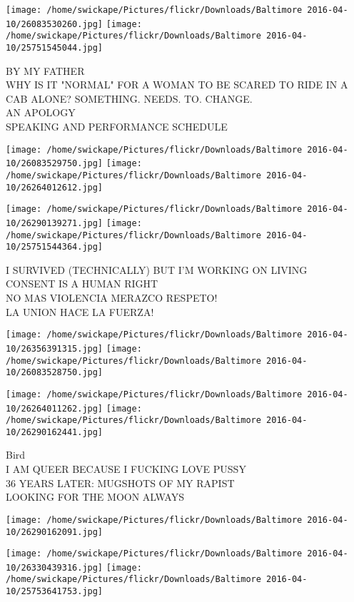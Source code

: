 \documentclass[10pt,letterpaper]{article}
\begin{document}
\texttt{[image: /home/swickape/Pictures/flickr/Downloads/Baltimore 2016-04-10/26083530260.jpg]}
\texttt{[image: /home/swickape/Pictures/flickr/Downloads/Baltimore 2016-04-10/25751545044.jpg]}

BY MY FATHER\\
WHY IS IT "NORMAL" FOR A WOMAN TO BE SCARED TO RIDE IN A CAB ALONE?  SOMETHING.  NEEDS.  TO.  CHANGE.\\
AN APOLOGY\\
SPEAKING AND PERFORMANCE SCHEDULE\\
\pagebreak

\texttt{[image: /home/swickape/Pictures/flickr/Downloads/Baltimore 2016-04-10/26083529750.jpg]}
\texttt{[image: /home/swickape/Pictures/flickr/Downloads/Baltimore 2016-04-10/26264012612.jpg]}

\texttt{[image: /home/swickape/Pictures/flickr/Downloads/Baltimore 2016-04-10/26290139271.jpg]}
\texttt{[image: /home/swickape/Pictures/flickr/Downloads/Baltimore 2016-04-10/25751544364.jpg]}

I SURVIVED (TECHNICALLY) BUT I'M WORKING ON LIVING\\
CONSENT IS A HUMAN RIGHT\\
NO MAS VIOLENCIA MERAZCO RESPETO!\\
LA UNION HACE LA FUERZA!\\
\pagebreak

\texttt{[image: /home/swickape/Pictures/flickr/Downloads/Baltimore 2016-04-10/26356391315.jpg]}
\texttt{[image: /home/swickape/Pictures/flickr/Downloads/Baltimore 2016-04-10/26083528750.jpg]}

\texttt{[image: /home/swickape/Pictures/flickr/Downloads/Baltimore 2016-04-10/26264011262.jpg]}
\texttt{[image: /home/swickape/Pictures/flickr/Downloads/Baltimore 2016-04-10/26290162441.jpg]}

Bird\\
I AM QUEER BECAUSE I FUCKING LOVE PUSSY\\
36 YEARS LATER: MUGSHOTS OF MY RAPIST\\
LOOKING FOR THE MOON ALWAYS\\
\pagebreak

\texttt{[image: /home/swickape/Pictures/flickr/Downloads/Baltimore 2016-04-10/26290162091.jpg]}

\vspace{0.25in}
\texttt{[image: /home/swickape/Pictures/flickr/Downloads/Baltimore 2016-04-10/26330439316.jpg]}
\texttt{[image: /home/swickape/Pictures/flickr/Downloads/Baltimore 2016-04-10/25753641753.jpg]}
\end{document}
